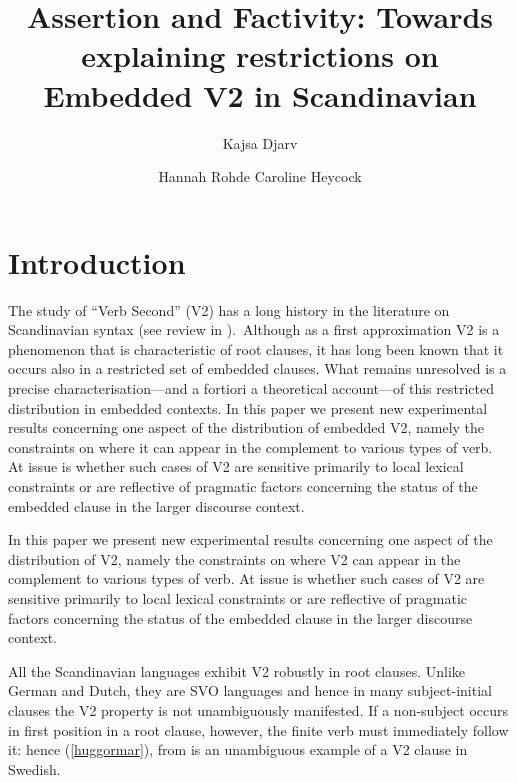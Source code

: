 \documentclass[output=paper]{LSP/langsci}
\author{Kajsa Djarv\affiliation{University of Pennsylvania} 
 \and Hannah Rohde\affiliation{University of Edinburgh} 
 \lastand Caroline Heycock\affiliation{University of Edinburgh}
}
\title{Assertion and Factivity: Towards explaining restrictions on Embedded V2 in Scandinavian}
\begin{document}
\section{Introduction}
 
The study of ``Verb Second'' (V2) has a long history in the literature on Scandinavian syntax (see review in \citealt{holmberg13}).\ Although as a first approximation V2 is a phenomenon that is characteristic of root clauses, it has long been known that it occurs also in a restricted set of embedded clauses. What remains unresolved is a precise characterisation---and a fortiori a theoretical account---of this restricted distribution in embedded contexts. In this paper we present new experimental results concerning one aspect of the distribution of embedded V2, namely the constraints on where it can appear in the complement to various types of verb. At issue is whether such cases of V2 are sensitive primarily to local lexical constraints or are reflective of pragmatic factors concerning the status of the embedded clause in the larger discourse context.

In this paper we present new experimental results concerning one aspect of the distribution of V2, namely the constraints on where V2 can appear in the complement to various types of verb. At issue is whether such cases of V2 are sensitive primarily to local lexical constraints or are reflective of pragmatic factors concerning the status of the embedded clause in the larger discourse context.

All the Scandinavian languages exhibit V2 robustly in root clauses. Unlike German and Dutch, they are SVO languages and hence in many subject-initial clauses the V2 property is not unambiguously manifested. If a non-subject occurs in first position in a root clause, however, the finite verb must immediately follow it: hence (\ref{huggormar}), from \cite{holmberg13} is an unambiguous example of a V2 clause in Swedish.%
\begin{exe}
 \label{huggormar}
\end{exe}
\end{document}
